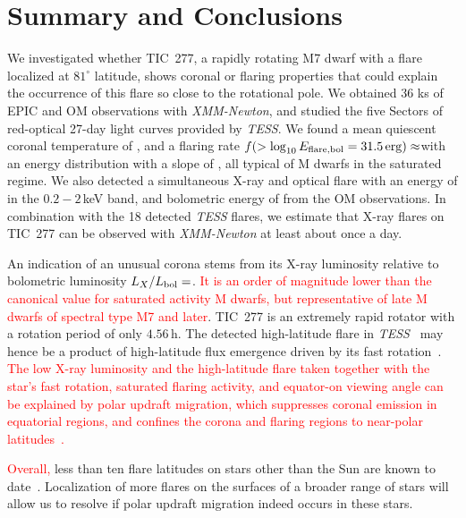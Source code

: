 \documentclass[twocolumn]{aastex631}
\begin{document}
\section{Summary and Conclusions}
\label{sec:summary}
We investigated whether TIC~277, a rapidly rotating M7 dwarf with a flare localized at $81^{\circ}$ latitude, shows coronal or flaring properties that could explain the occurrence of this flare so close to the rotational pole. We obtained 36 ks of EPIC and OM observations with \textit{XMM-Newton}, and studied the five Sectors of red-optical 27-day light curves provided by \textit{TESS}. We found a mean quiescent coronal temperature of \Tqmean, and a flaring rate $f(> \log_{10} E_{\rm flare, bol} = 31.5\,\rm{erg})\approx$\ffdr with an energy distribution with a slope of \ffdalpha, all typical of M dwarfs in the saturated regime. We also detected a simultaneous X-ray and optical flare with an energy of \eepic in the $0.2-2\,$keV band, and bolometric energy of \eom from the OM observations. In combination with the 18 detected \textit{TESS} flares, we estimate that X-ray flares on TIC~277 can be observed with \textit{XMM-Newton} at least about once a day. %

An indication of an unusual corona stems from its X-ray luminosity relative to bolometric luminosity $L_X/L_{\rm bol}=$\LXLbol\hspace{-0.1cm}. \textcolor{red}{It is an order of magnitude lower than the canonical value for saturated activity M dwarfs, but representative of late M dwarfs of spectral type M7 and later}. TIC~277 is an extremely rapid rotator with a rotation period of only $4.56\,$h. The detected high-latitude flare in \textit{TESS}~\citep{ilin2021giant} may hence be a product of high-latitude flux emergence driven by its fast rotation~\citep{weber2016modeling,weber2017suppression}. \textcolor{red}{The low X-ray luminosity and the high-latitude flare taken together with the star's fast rotation, saturated flaring activity, and equator-on viewing angle can be explained by polar updraft migration, which suppresses coronal emission in equatorial regions, and confines the corona and flaring regions to near-polar latitudes~\citep{stepien2001rosat}. }

\textcolor{red}{Overall, }less than ten flare latitudes on stars other than the Sun are known to date~\citep{wolter2008doppler, ilin2021giant, johnson2021simultaneous}. Localization of more flares on the surfaces of a broader range of stars will allow us to resolve if polar updraft migration indeed occurs in these stars.
\end{document}
